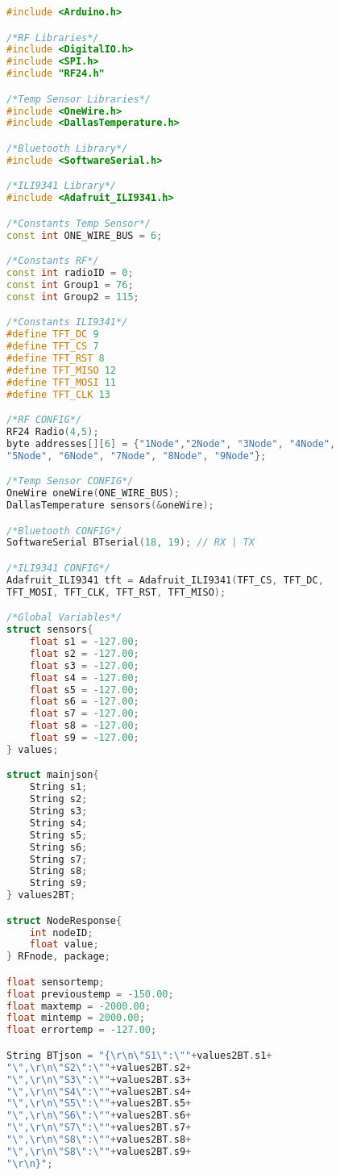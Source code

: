 \begin{lstlisting}[language=C++, caption={Firmware de nuestro prototipo en su versión 1.0}, captionpos=b, basicstyle=\small]
#include <Arduino.h>

/*RF Libraries*/
#include <DigitalIO.h>
#include <SPI.h>
#include "RF24.h"

/*Temp Sensor Libraries*/
#include <OneWire.h>
#include <DallasTemperature.h>

/*Bluetooth Library*/
#include <SoftwareSerial.h>

/*ILI9341 Library*/
#include <Adafruit_ILI9341.h>

/*Constants Temp Sensor*/
const int ONE_WIRE_BUS = 6;

/*Constants RF*/
const int radioID = 0;
const int Group1 = 76;
const int Group2 = 115;

/*Constants ILI9341*/
#define TFT_DC 9
#define TFT_CS 7
#define TFT_RST 8
#define TFT_MISO 12
#define TFT_MOSI 11
#define TFT_CLK 13

/*RF CONFIG*/
RF24 Radio(4,5);
byte addresses[][6] = {"1Node","2Node", "3Node", "4Node", 
"5Node", "6Node", "7Node", "8Node", "9Node"};

/*Temp Sensor CONFIG*/
OneWire oneWire(ONE_WIRE_BUS);
DallasTemperature sensors(&oneWire);

/*Bluetooth CONFIG*/
SoftwareSerial BTserial(18, 19); // RX | TX

/*ILI9341 CONFIG*/
Adafruit_ILI9341 tft = Adafruit_ILI9341(TFT_CS, TFT_DC, 
TFT_MOSI, TFT_CLK, TFT_RST, TFT_MISO);

/*Global Variables*/
struct sensors{
	float s1 = -127.00;
	float s2 = -127.00;
	float s3 = -127.00;
	float s4 = -127.00;
	float s5 = -127.00;
	float s6 = -127.00;
	float s7 = -127.00;
	float s8 = -127.00;
	float s9 = -127.00;
} values;

struct mainjson{
	String s1;
	String s2;
	String s3;
	String s4;
	String s5;
	String s6;
	String s7;
	String s8;
	String s9;
} values2BT;

struct NodeResponse{
	int nodeID;
	float value;
} RFnode, package;

float sensortemp;
float previoustemp = -150.00;
float maxtemp = -2000.00;
float mintemp = 2000.00;
float errortemp = -127.00;

String BTjson = "{\r\n\"S1\":\""+values2BT.s1+
"\",\r\n\"S2\":\""+values2BT.s2+
"\",\r\n\"S3\":\""+values2BT.s3+
"\",\r\n\"S4\":\""+values2BT.s4+
"\",\r\n\"S5\":\""+values2BT.s5+
"\",\r\n\"S6\":\""+values2BT.s6+
"\",\r\n\"S7\":\""+values2BT.s7+
"\",\r\n\"S8\":\""+values2BT.s8+
"\",\r\n\"S8\":\""+values2BT.s9+
"\r\n}";



\end{lstlisting}
